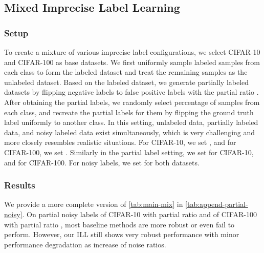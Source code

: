 \subsection{Mixed Imprecise Label Learning}

\subsubsection{Setup}

To create a mixture of various imprecise label configurations, we select CIFAR-10 and CIFAR-100 as base datasets. 
We first uniformly sample  labeled samples from each class to form the labeled dataset and treat the remaining samples as the unlabeled dataset.
Based on the labeled dataset, we generate partially labeled datasets by flipping negative labels to false positive labels with the partial ratio . 
After obtaining the partial labels, we randomly select  percentage of samples from each class, and recreate the partial labels for them by flipping the ground truth label uniformly to another class. 
In this setting, unlabeled data, partially labeled data, and noisy labeled data exist simultaneously, which is very challenging and more closely resembles realistic situations. 
For CIFAR-10, we set , and for CIFAR-100, we set . 
Similarly in the partial label setting, we set  for CIFAR-10, and  for CIFAR-100.
For noisy labels, we set  for both datasets.

 




\subsubsection{Results}


We provide a more complete version of \cref{tab:main-mix} in \cref{tab:append-partial-noisy}. 
On partial noisy labels of CIFAR-10 with partial ratio  and of CIFAR-100 with partial ratio , most baseline methods are more robust or even fail to perform. 
However, our ILL still shows very robust performance with minor performance degradation as increase of noise ratios. 


